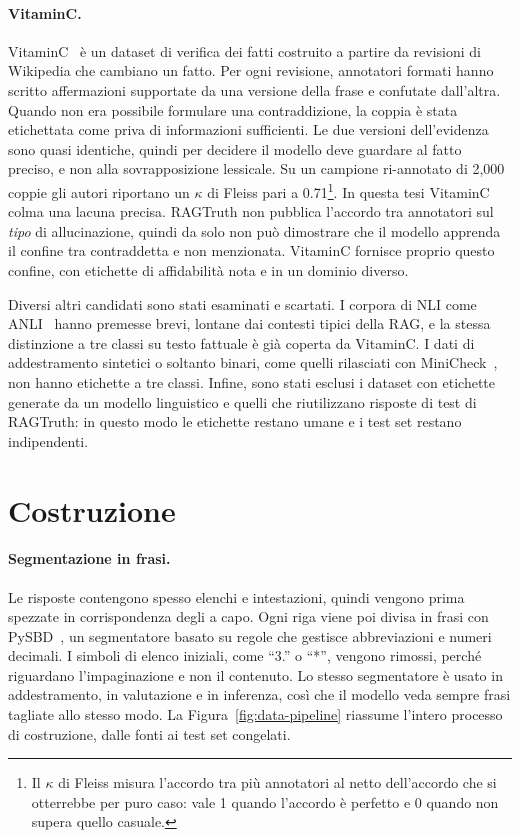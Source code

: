 \paragraph{VitaminC.} VitaminC~\cite{schuster2021vitaminc,hf_vitaminc} è un dataset di verifica dei fatti costruito a
partire da revisioni di Wikipedia che cambiano un fatto. Per ogni revisione, annotatori formati hanno scritto
affermazioni supportate da una versione della frase e confutate dall'altra. Quando non era possibile formulare una
contraddizione, la coppia è stata etichettata come priva di informazioni sufficienti. Le due versioni dell'evidenza sono
quasi identiche, quindi per decidere il modello deve guardare al fatto preciso, e non alla sovrapposizione lessicale. Su
un campione ri-annotato di 2{,}000 coppie gli autori riportano un $\kappa$ di Fleiss pari a 0.71\footnote{Il $\kappa$
di Fleiss misura l'accordo tra più annotatori al netto dell'accordo che si otterrebbe per puro caso: vale 1 quando
l'accordo è perfetto e 0 quando non supera quello casuale.}. In questa tesi VitaminC colma una lacuna precisa. RAGTruth
non pubblica l'accordo tra annotatori sul \emph{tipo} di allucinazione, quindi da solo non può dimostrare che il modello
apprenda il confine tra contraddetta e non menzionata. VitaminC fornisce proprio questo confine, con etichette di
affidabilità nota e in un dominio diverso.

Diversi altri candidati sono stati esaminati e scartati. I corpora di NLI come ANLI~\cite{nie2020anli} hanno premesse
brevi, lontane dai contesti tipici della RAG, e la stessa distinzione a tre classi su testo fattuale è già coperta da
VitaminC. I dati di addestramento sintetici o soltanto binari, come quelli rilasciati con MiniCheck~\cite{tang2024minicheck},
non hanno etichette a tre classi. Infine, sono stati esclusi i dataset con etichette generate da un modello linguistico
e quelli che riutilizzano risposte di test di RAGTruth: in questo modo le etichette restano umane e i test set restano
indipendenti.

\section{Costruzione}
\label{sec:data-construction}

\paragraph{Segmentazione in frasi.} Le risposte contengono spesso elenchi e intestazioni, quindi vengono prima spezzate
in corrispondenza degli a capo. Ogni riga viene poi divisa in frasi con PySBD~\cite{sadvilkar2020pysbd}, un
segmentatore basato su regole che gestisce abbreviazioni e numeri decimali. I simboli di elenco iniziali, come ``3.'' o
``*'', vengono rimossi, perché riguardano l'impaginazione e non il contenuto. Lo stesso segmentatore è usato in
addestramento, in valutazione e in inferenza, così che il modello veda sempre frasi tagliate allo stesso modo. La Figura~\ref{fig:data-pipeline} riassume l'intero processo di costruzione, dalle fonti ai test set congelati.

